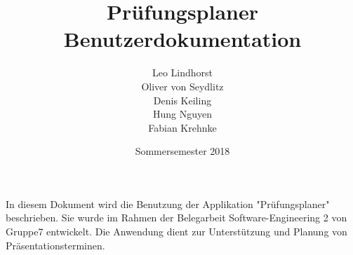 \documentclass{scrartcl}
\begin{document}
	\title{Prüfungsplaner \\ Benutzerdokumentation}
	\author{Leo Lindhorst\\
		Oliver von Seydlitz\\
		Denis Keiling\\
		Hung Nguyen\\
		Fabian Krehnke}
	\date{Sommersemester 2018}
	\maketitle

	 In diesem Dokument wird die Benutzung der Applikation "Prüfungsplaner" beschrieben. Sie wurde im Rahmen der Belegarbeit Software-Engineering 2 von Gruppe7 entwickelt. Die Anwendung dient zur Unterstützung und Planung von Präsentationsterminen.

	\tableofcontents

	
	
\end{document}

